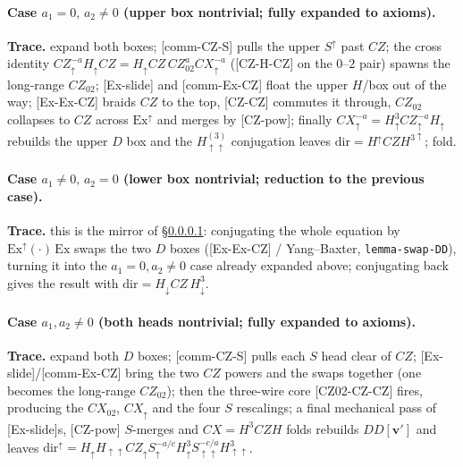 \documentclass[a4paper]{article}
\newcommand{\lem}[1]{\textsf{[#1]}}      %
\begin{document}
\paragraph{Case $a_1=0,\,a_2\neq0$ \;(upper box nontrivial; fully expanded to axioms).}\label{sub:czdd2}
\begin{center}\end{center}
\newpage
\begin{center}\end{center}
\textbf{Trace.} expand both boxes; \lem{comm-CZ-S} pulls the upper $S^{\uparrow}$ past $CZ$; the cross identity $CZ^{-a}_\uparrow H_\uparrow CZ = H_\uparrow CZ\, CZ_{02}^{a} CX^{-a}_\uparrow$ (\lem{CZ-H-CZ} on the $0$--$2$ pair) spawns the long-range $CZ_{02}$; \lem{Ex-slide} and \lem{comm-Ex-CZ} float the upper $H$/box out of the way; \lem{Ex-Ex-CZ} braids $CZ$ to the top, \lem{CZ-CZ} commutes it through, $CZ_{02}$ collapses to $CZ$ across $\mathrm{Ex}^{\uparrow}$ and merges by \lem{CZ-pow}; finally $CX^{-a}_\uparrow=H^3_\uparrow CZ^{-a}_\uparrow H_\uparrow$ rebuilds the upper $D$ box and the $H^{(3)}_{\uparrow\uparrow}$ conjugation leaves $\mathrm{dir}=H^{\uparrow}CZ H^{3\uparrow}$; fold.

\paragraph{Case $a_1\neq0,\,a_2=0$ \;(lower box nontrivial; reduction to the previous case).}\label{sub:czdd3}
\begin{center}\end{center}
\textbf{Trace.} this is the mirror of \S\ref{sub:czdd2}: conjugating the whole equation by $\mathrm{Ex}^{\uparrow}(\cdot)\,\mathrm{Ex}$ swaps the two $D$ boxes (\lem{Ex-Ex-CZ} / Yang--Baxter, \texttt{lemma-swap-DD}), turning it into the $a_1=0,a_2\neq0$ case already expanded above; conjugating back gives the result with $\mathrm{dir}=H_\downarrow CZ\,H^3_\downarrow$.

\paragraph{Case $a_1,a_2\neq0$ \;(both heads nontrivial; fully expanded to axioms).}\label{sub:czdd4}
\begin{center}\end{center}
\newpage
\begin{center}\end{center}
\textbf{Trace.} expand both $D$ boxes; \lem{comm-CZ-S} pulls each $S$ head clear of $CZ$; \lem{Ex-slide}/\lem{comm-Ex-CZ} bring the two $CZ$ powers and the swaps together (one becomes the long-range $CZ_{02}$); then the three-wire core \lem{CZ02-CZ-CZ} fires, producing the $CX_{02}$, $CX_\uparrow$ and the four $S$ rescalings; a final mechanical pass of \lem{Ex-slide}s, \lem{CZ-pow} $S$-merges and $CX=H^3CZH$ folds rebuilds $DD[\mathbf v']$ and leaves $\mathrm{dir}^{\uparrow}=H_\uparrow H_{\uparrow\uparrow}CZ_\uparrow S^{-a/c}_\uparrow H^3_\uparrow S^{-c/a}_{\uparrow\uparrow}H^3_{\uparrow\uparrow}$.
\end{document}
